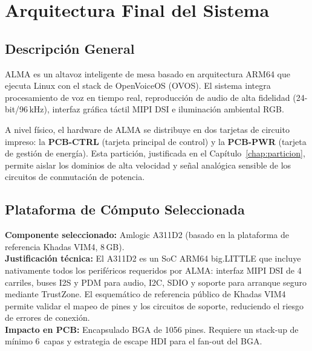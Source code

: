 \chapter{Arquitectura Final del Sistema}
\label{chap:arquitectura}

\section{Descripción General}
\label{sec:arq_descripcion}

ALMA es un altavoz inteligente de mesa basado en arquitectura ARM64 que ejecuta Linux con
el stack de OpenVoiceOS (OVOS). El sistema integra procesamiento de voz en tiempo real,
reproducción de audio de alta fidelidad (24-bit/96\,kHz), interfaz gráfica táctil MIPI DSI e
iluminación ambiental RGB.

A nivel físico, el hardware de ALMA se distribuye en dos tarjetas de circuito impreso:
la \textbf{PCB-CTRL} (tarjeta principal de control) y la \textbf{PCB-PWR} (tarjeta de
gestión de energía). Esta partición, justificada en el Capítulo~\ref{chap:particion},
permite aislar los dominios de alta velocidad y señal analógica sensible de los circuitos de
conmutación de potencia.

\section{Plataforma de Cómputo Seleccionada}
\label{sec:arq_soc}

\begin{decisbox}
  \textbf{Componente seleccionado:} Amlogic A311D2 (basado en la plataforma de
  referencia Khadas VIM4, 8\,GB).\\[4pt]
  \textbf{Justificación técnica:} El A311D2 es un SoC ARM64 big.LITTLE que incluye
  nativamente todos los periféricos requeridos por ALMA: interfaz MIPI DSI de 4 carriles,
  buses I2S y PDM para audio, I2C, SDIO y soporte para arranque seguro mediante TrustZone.
  El esquemático de referencia público de Khadas VIM4 permite validar el mapeo de pines y
  los circuitos de soporte, reduciendo el riesgo de errores de conexión.\\[4pt]
  \textbf{Impacto en PCB:} Encapsulado BGA de 1056 pines. Requiere un stack-up de mínimo
  6~capas y estrategia de escape HDI para el fan-out del BGA.
\end{decisbox}

